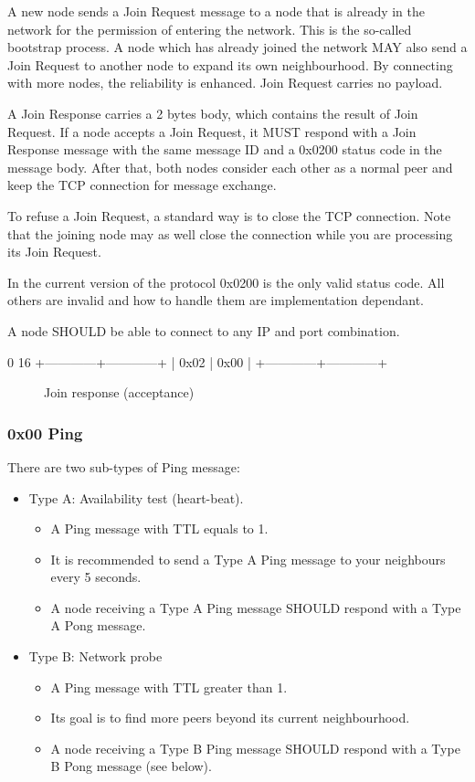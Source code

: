 \documentclass[12pt, a4paper]{article}
\begin{document}
A new node sends a Join Request message to a node that is already in the network for the permission of entering the network.
This is the so-called bootstrap process.
A node which has already joined the network MAY also send a Join Request to another node to expand its own neighbourhood.
By connecting with more nodes, the reliability is enhanced.
Join Request carries no payload.

A Join Response carries a 2 bytes body, which contains the result of Join Request.
If a node accepts a Join Request, it MUST respond with a Join Response message with the same message ID and a 0x0200 status code in the message body.
After that, both nodes consider each other as a normal peer and keep the TCP connection for message exchange.

To refuse a Join Request, a standard way is to close the TCP connection.
Note that the joining node may as well close the connection while you are processing its Join Request.

In the current version of the protocol 0x0200 is the only valid status code.
All others are invalid and how to handle them are implementation dependant.

A node SHOULD be able to connect to any IP and port combination.


\begin{verbbox}
0                          16
+------------+------------+
|    0x02    |    0x00    |
+------------+------------+
\end{verbbox}

\begin{figure}[h!]
  \centering
  \theverbbox
  \label{joinresponse}
  \caption{Join response (acceptance)}
\end{figure}

\subsubsection{0x00 Ping}
There are two sub-types of Ping message:

\begin{itemize}
\item Type A: Availability test (heart-beat).
\begin{itemize}
\item A Ping message with TTL equals to 1.
\item It is recommended to send a Type A Ping message to your neighbours every 5 seconds.
\item A node receiving a Type A Ping message SHOULD respond with a Type A Pong message.
\end{itemize}
\item Type B: Network probe
\begin{itemize}
\item A Ping message with TTL greater than 1.
\item Its goal is to find more peers beyond its current neighbourhood.
\item A node receiving a Type B Ping message SHOULD respond with a Type B Pong message (see below). 
\end{itemize}
\end{itemize}
\end{document}
